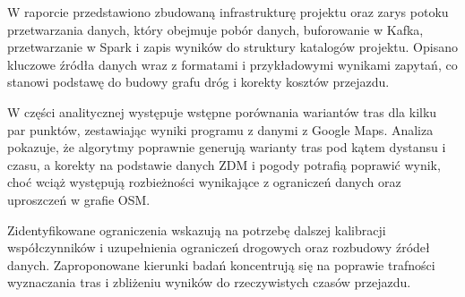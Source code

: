 \documentclass[12pt]{article}
\begin{document}
W raporcie przedstawiono zbudowaną infrastrukturę projektu oraz zarys potoku przetwarzania danych,
który obejmuje pobór danych, buforowanie w Kafka, przetwarzanie w Spark i zapis wyników do
struktury katalogów projektu. Opisano kluczowe źródła danych wraz z formatami i przykładowymi 
wynikami zapytań, co stanowi podstawę do budowy grafu dróg i korekty kosztów przejazdu.

W części analitycznej występuje wstępne porównania wariantów tras dla kilku par punktów,
zestawiając wyniki programu z danymi z Google Maps. Analiza pokazuje, że algorytmy poprawnie
generują warianty tras pod kątem dystansu i czasu, a korekty na podstawie danych ZDM i pogody
potrafią poprawić wynik, choć wciąż występują rozbieżności wynikające z ograniczeń danych
oraz uproszczeń w grafie OSM.

Zidentyfikowane ograniczenia wskazują na potrzebę dalszej kalibracji współczynników i
uzupełnienia ograniczeń drogowych oraz rozbudowy źródeł danych. Zaproponowane kierunki badań
koncentrują się na poprawie trafności wyznaczania tras i zbliżeniu wyników do rzeczywistych
czasów przejazdu.
\end{document}
